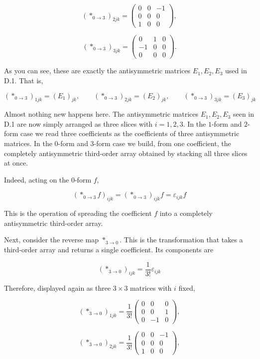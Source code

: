 \documentclass[a4paper,12pt,openany]{book}
\begin{document}
\[
(\ast_{0\to3})_{2jk}
=
\begin{pmatrix}
0&0&-1\\
0&0&0\\
1&0&0
\end{pmatrix},
\]

\[
(\ast_{0\to3})_{3jk}
=
\begin{pmatrix}
0&1&0\\
-1&0&0\\
0&0&0
\end{pmatrix}.
\]

As you can see, these are exactly the antisymmetric matrices
\(E_1,E_2,E_3\) used in D.1. That is,

\[
(\ast_{0\to3})_{1jk}= (E_1)_{jk},
\qquad
(\ast_{0\to3})_{2jk}= (E_2)_{jk},
\qquad
(\ast_{0\to3})_{3jk}= (E_3)_{jk}
\]

Almost nothing new happens here. The antisymmetric matrices
\(E_1,E_2,E_3\) seen in D.1 are now simply arranged as three slices with
\(i=1,2,3\). In the \(1\)-form and \(2\)-form case we read three
coefficients as the coefficients of three antisymmetric matrices. In the
\(0\)-form and \(3\)-form case we build, from one coefficient, the
completely antisymmetric third-order array obtained by stacking all
three slices at once.

Indeed, acting on the \(0\)-form \(f\),

\[
(\ast_{0\to3}f)_{ijk}
=
(\ast_{0\to3})_{ijk}f
=
\varepsilon_{ijk}f
\]

This is the operation of spreading the coefficient \(f\) into a
completely antisymmetric third-order array.

Next, consider the reverse map \(\ast_{3\to0}\). This is the
transformation that takes a third-order array and returns a single
coefficient. Its components are

\[
(\ast_{3\to0})_{ijk}
=
\frac{1}{3!}\varepsilon_{ijk}
\]

Therefore, displayed again as three \(3\times3\) matrices with \(i\)
fixed,

\[
(\ast_{3\to0})_{1jk}
=
\frac{1}{3!}
\begin{pmatrix}
0&0&0\\
0&0&1\\
0&-1&0
\end{pmatrix},
\]

\[
(\ast_{3\to0})_{2jk}
=
\frac{1}{3!}
\begin{pmatrix}
0&0&-1\\
0&0&0\\
1&0&0
\end{pmatrix},
\]
\end{document}

